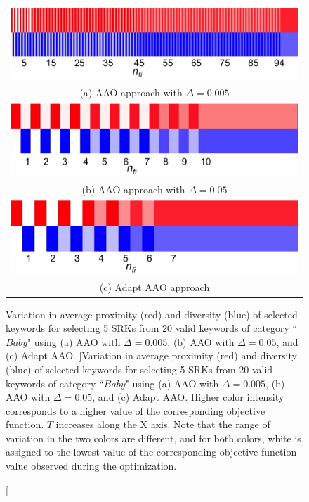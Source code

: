 \begin{figure}
\centering
\begin{tabular}{c}
\includegraphics[width=0.85\linewidth]{TrainingData/figs/pt005proxdivAAO2.png} \\ 
(a) AAO approach with $\Delta=0.005$ \\ 
\includegraphics[width=0.85\linewidth]{TrainingData/figs/pt05proxdivAAO2.png} \\ 
(b) AAO approach with $\Delta=0.05$ \\ 
\includegraphics[width=0.85\linewidth]{TrainingData/figs/proxdivadaptAAO2.png} \\ 
(c) Adapt AAO approach 
\end{tabular} 
\caption[Variation in average proximity (red) and diversity (blue) of selected keywords for selecting 5 SRKs from 20 valid keywords of category ``$Baby$" using (a)  AAO with $\Delta=0.005$, (b) AAO with $\Delta=0.05$, and (c) Adapt AAO. ]{Variation in average proximity (red) and diversity (blue) of selected keywords for selecting 5 SRKs from 20 valid keywords of category ``$Baby$" using (a)  AAO with $\Delta=0.005$, (b) AAO with $\Delta=0.05$, and (c) Adapt AAO. Higher color intensity corresponds to a higher value of the corresponding objective function. $T$ increases along the X axis. Note that the range of variation in the two colors are different, and for both colors, white is assigned to the lowest value of the corresponding objective function value observed during the optimization. }
\label{fig:proxdivVariationAAO}
\end{figure}


